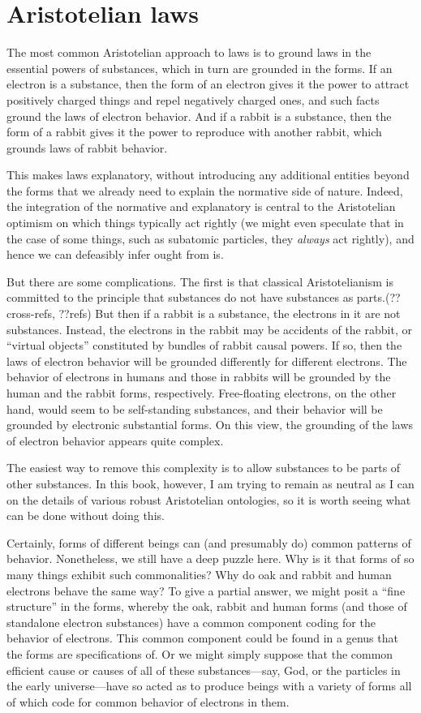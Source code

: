 \section{Aristotelian laws}
The most common Aristotelian approach to laws is to ground laws in the essential powers of substances, which in turn are
grounded in the forms. If an electron is a substance, then the form of an electron gives it the power to attract positively 
charged things and repel negatively charged ones, and such facts ground the laws of electron behavior. And if a rabbit is 
a substance, then the form of a rabbit gives it the power to reproduce with another rabbit, which grounds laws of rabbit
behavior. 

This makes laws explanatory, without introducing any additional entities beyond the forms that we already need to explain
the normative side of nature. Indeed, the integration of the normative and explanatory is central to the Aristotelian
optimism on which things typically act rightly (we might even speculate that in the case of some things, such as 
subatomic particles, they \textit{always} act rightly), and hence we can defeasibly infer ought from is.

But there are some complications. The first is that classical Aristotelianism is committed to the principle that 
substances do not have substances as parts.(??cross-refs, ??refs) But then if a rabbit is a substance, the electrons in
it are not substances. Instead, the electrons in the rabbit may be accidents of the rabbit, or ``virtual objects'' 
constituted by bundles of rabbit causal powers. If so, then the laws of electron behavior will be grounded differently
for different electrons. The behavior of electrons in humans and those in rabbits will be grounded by the human and the 
rabbit forms, respectively. Free-floating electrons, on the other hand, would seem to be self-standing substances, and
their behavior will be grounded by electronic substantial forms. On this view, the grounding of the laws of electron 
behavior appears quite complex.

The easiest way to remove this complexity is to allow substances to be parts of other substances. In this book, however, 
I am trying to remain as neutral as I can on the details of various robust Aristotelian ontologies, so it is worth seeing
what can be done without doing this.

Certainly, forms of different beings can (and presumably do) common patterns of behavior.  Nonetheless, we still have a 
deep puzzle here. Why is it that forms of so many things exhibit such commonalities? Why do oak and rabbit and human
electrons behave the same way? To give a partial answer, we might posit a ``fine structure'' in the forms, whereby the oak, 
rabbit and human forms (and those of standalone electron substances) have a common component coding for the behavior of 
electrons. This common component could be found in a genus that the forms are specifications of. Or we might simply suppose
that the common efficient cause or causes of all of these substances---say, God, or the particles in the early universe---have
so acted as to produce beings with a variety of forms all of which code for common behavior of electrons in them. 

